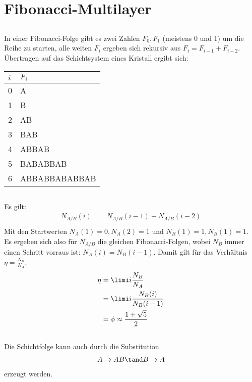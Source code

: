 \documentclass[exa]{exercise_5.0}
\begin{document}
\section{Fibonacci-Multilayer}
\subsection{}
In einer Fibonacci-Folge gibt es zwei Zahlen $F_0,F_1$ (meistens 0 und 1) um die Reihe zu starten, alle weiten $F_i$ ergeben sich rekursiv aus $F_i=F_{i-1}+F_{i-2}$. Übertragen auf das Schichtsystem eines Kristall ergibt sich:

\begin{table}[H]
\centering
\begin{tabular}{@{}ll@{}}
    \toprule
    $i$& $F_i$ \\
    \midrule
    0& A \\
    1& B \\
    2& AB \\
    3& BAB \\
    4& ABBAB \\
    5& BABABBAB \\
    6& ABBABBABABBAB \\
    \bottomrule
\end{tabular}
\end{table}

\subsection{}
Es gilt:
\begin{align*}
    N_{A/B}(i) &= N_{A/B}(i-1) + N_{A/B}(i-2)\\
\end{align*}
Mit den Startwerten $N_A(1) = 0, N_A(2) = 1$ und $N_B(1) = 1, N_B(1) = 1$. 
Es ergeben sich also für $N_{A/B}$ die gleichen Fibonacci-Folgen, wobei $N_B$ immer einen Schritt vorraus ist: $N_A(i) = N_B(i-1)$. 
Damit gilt für das Verhältnis $\eta = \frac{N_B}{N_A}$:
\begin{align*}
    \eta  &= \limi i\frac{N_B}{N_A} \\
    &=\limi i \frac{N_B(i)}{N_B(i-1)}\\
    &= \phi \approx \frac{1+\sqrt 5}{2}
\end{align*}

\subsection{}
Die Schichtfolge kann auch durch die Substitution 
\begin{align*}
    A \to AB \tand B \to A
\end{align*}
erzeugt werden. 
\end{document}
